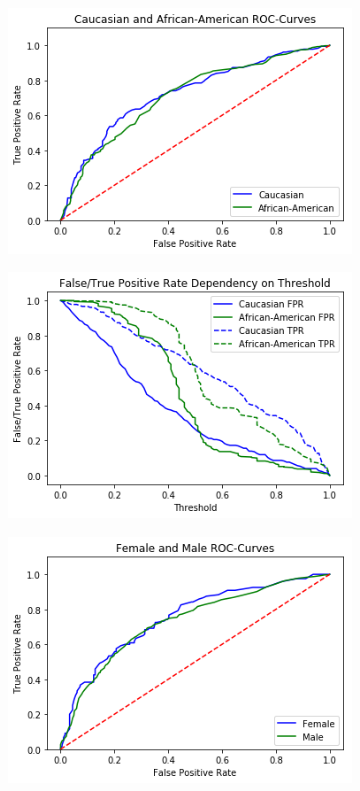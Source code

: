 \documentclass[11pt, fleqn, titlepage]{article}
\begin{document}
	\begin{figure}[H]
		\centering
		\begin{subfigure}{0.5\textwidth}
			\centering
			\includegraphics[width=0.9\linewidth]{imgs/ROC.png}
		\end{subfigure}%
		\begin{subfigure}{0.5\textwidth}
			\centering
			\includegraphics[width=0.9\linewidth]{imgs/fpr_tpr_plot.png}
		\end{subfigure}
		\begin{subfigure}{0.5\textwidth}
			\centering
			\includegraphics[width=0.9\linewidth]{imgs/ROC_sex.png}

\end{subfigure}
\end{figure}
\end{document}
